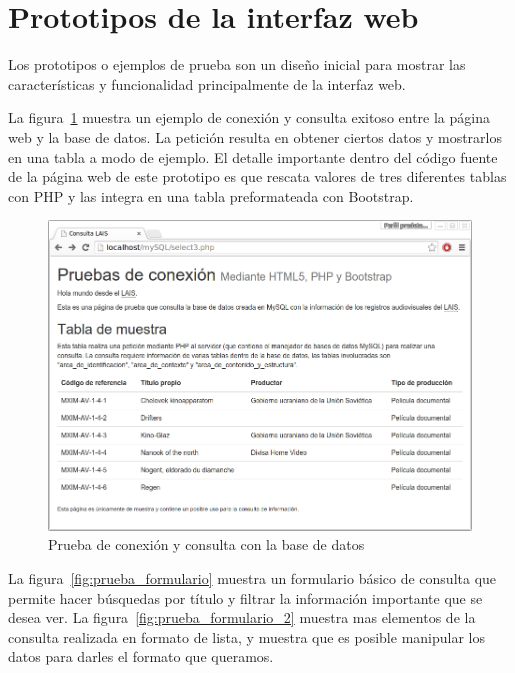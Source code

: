 \documentclass[10pt,letterpaper]{article}
\begin{document}
\section{Prototipos de la interfaz web}
Los prototipos o ejemplos de prueba son un diseño inicial para mostrar las características y funcionalidad principalmente de la interfaz web.

La figura~\ref{fig:prueba_conexion} muestra un ejemplo de conexión y consulta exitoso entre la página web y la base de datos. La petición resulta en obtener ciertos datos y mostrarlos en una tabla a modo de ejemplo. El detalle importante dentro del código fuente de la página web de este prototipo es que rescata valores de tres diferentes tablas con PHP y las integra en una tabla preformateada con Bootstrap.

\begin{figure}[H]
	\centering
	\includegraphics[keepaspectratio=true,width=\linewidth]{Prototipo_01.png}
	\caption{Prueba de conexión y consulta con la base de datos}
	\label{fig:prueba_conexion}
\end{figure}

La figura~\ref{fig:prueba_formulario} muestra un formulario básico de consulta que permite hacer búsquedas por título y filtrar la información importante que se desea ver. La figura~\ref{fig:prueba_formulario_2} muestra mas elementos de la consulta realizada en formato de lista, y muestra que es posible manipular los datos para darles el formato que queramos.
\end{document}
